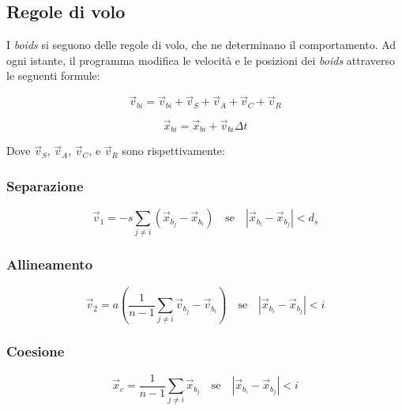 \documentclass[10pt,a4paper]{article}
\begin{document}
\subsection{Regole di volo}

I \textit{boids} si seguono delle regole di volo, che ne determinano il comportamento. Ad ogni istante, il programma modifica le velocità e le posizioni dei \textit{boids} attraverso le seguenti formule:

\begin{equation*}
    \vec{v}_{bi} = \vec{v}_{bi} + \vec{v}_S + \vec{v}_A + \vec{v}_C + \vec{v}_R
\end{equation*}

\begin{equation*}
    \vec{x}_{bi} = \vec{x}_{bi} + \vec{v}_{bi} \Delta t
\end{equation*}

Dove $\vec{v}_S$, $\vec{v}_A$, $\vec{v}_C$, e $\vec{v}_R$ sono rispettivamente:

\subsubsection{Separazione}

\begin{equation*}
    \vec{v}_1 = -s \sum_{j \neq i} (\vec{x}_{b_j} - \vec{x}_{b_i}) \quad \text{se} \quad \left| \vec{x}_{b_i} - \vec{x}_{b_j} \right| < d_s
\end{equation*}

\subsubsection{Allineamento}

\begin{equation*}
    \vec{v}_2 = a \left( \frac{1}{n-1} \sum_{j \neq i} \vec{v}_{b_j} - \vec{v}_{b_i} \right) \quad \text{se} \quad \left| \vec{x}_{b_i} - \vec{x}_{b_j} \right| < i
\end{equation*}

\subsubsection{Coesione}

\begin{equation*}
    \vec{x}_c = \frac{1}{n-1} \sum_{j \neq i} \vec{x}_{b_j} \quad \text{se} \quad \left| \vec{x}_{b_i} - \vec{x}_{b_j} \right| < i
\end{equation*}
\end{document}
